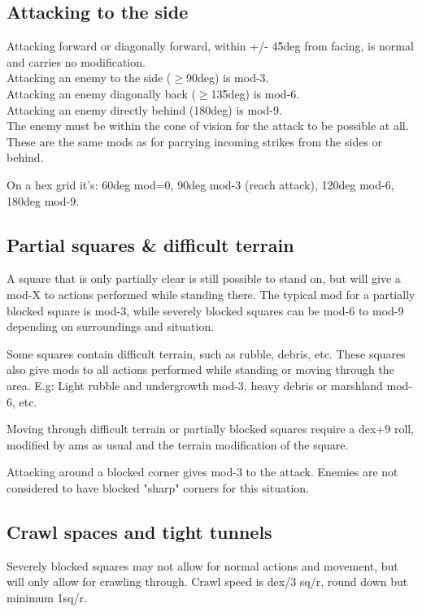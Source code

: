 \subsection*{Attacking to the side}
Attacking forward or diagonally forward, within +/- 45deg from facing, is normal and carries no modification. \\
Attacking an enemy to the side ($\ge$90deg) is mod-3. \\
Attacking an enemy diagonally back ($\ge$135deg) is mod-6. \\
Attacking an enemy directly behind (180deg) is mod-9. \\
The enemy must be within the cone of vision for the attack to be possible at all. \\
These are the same mods as for parrying incoming strikes from the sides or behind.

On a hex grid it's: 60deg mod=0, 90deg mod-3 (reach attack), 120deg mod-6, 180deg mod-9.


\subsection*{Partial squares \& difficult terrain}
A square that is only partially clear is still possible to stand on, but will give a mod-X to actions performed while standing there. The typical mod for a partially blocked square is mod-3, while severely blocked squares can be mod-6 to mod-9 depending on surroundings and situation.

Some squares contain difficult terrain, such as rubble, debris, etc. These squares also give mods to all actions performed while standing or moving through the area. E.g: Light rubble and undergrowth mod-3, heavy debris or marshland mod-6, etc.

Moving through difficult terrain or partially blocked squares require a dex+9 roll, modified by ams as usual and the terrain modification of the square.

Attacking around a blocked corner gives mod-3 to the attack. Enemies are not considered to have blocked "sharp" corners for this situation.


\subsection*{Crawl spaces and tight tunnels}
Severely blocked squares may not allow for normal actions and movement, but will only allow for crawling through. Crawl speed is dex/3 sq/r, round down but minimum 1sq/r.


